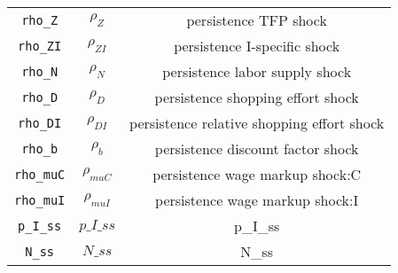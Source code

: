 \begin{center}
\begin{longtable}{ccc}
\texttt{rho\_Z} & ${\rho_Z}$ & persistence TFP shock\\
\texttt{rho\_ZI} & ${\rho_{ZI}}$ & persistence I-specific shock\\
\texttt{rho\_N} & ${\rho_N}$ & persistence labor supply shock\\
\texttt{rho\_D} & ${\rho_D}$ & persistence shopping effort shock\\
\texttt{rho\_DI} & ${\rho_{DI}}$ & persistence relative shopping effort shock\\
\texttt{rho\_b} & ${\rho_b}$ & persistence discount factor shock\\
\texttt{rho\_muC} & ${\rho_{muC}}$ & persistence wage markup shock:C\\
\texttt{rho\_muI} & ${\rho_{muI}}$ & persistence wage markup shock:I\\
\texttt{p\_I\_ss} & $p\_I\_ss$ & p\_I\_ss\\
\texttt{N\_ss} & $N\_ss$ & N\_ss\\
\hline%
\end{longtable}
\end{center}

